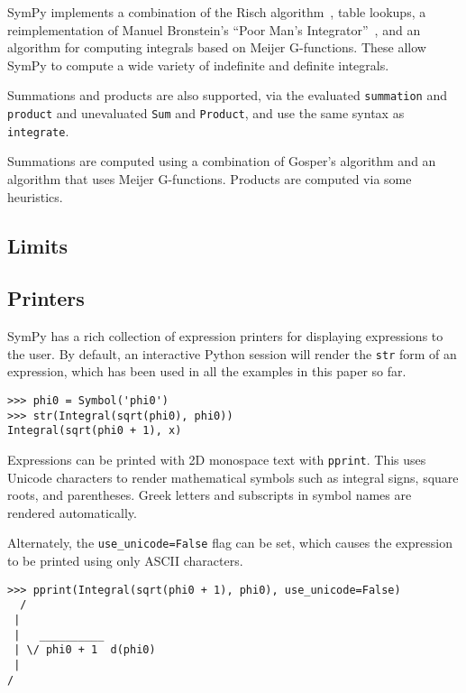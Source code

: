 SymPy implements a combination of the Risch
algorithm~\cite{bronstein2005integration}, table lookups, a reimplementation
of Manuel Bronstein's ``Poor Man's Integrator''~\cite{Bronstein2005pmint}, and
an algorithm for computing integrals based on Meijer G-functions. These allow
SymPy to compute a wide variety of indefinite and definite integrals.

Summations and products are also supported, via the evaluated \verb|summation|
and \verb|product| and unevaluated \verb|Sum| and \verb|Product|, and use the
same syntax as \verb|integrate|.

Summations are computed using a combination of Gosper's algorithm and an
algorithm that uses Meijer G-functions. Products are computed via some
heuristics.

\subsection{Limits}



\subsection{Printers}

SymPy has a rich collection of expression printers for displaying expressions
to the user. By default, an interactive Python session will render the
\verb|str| form of an expression, which has been used in all the examples in
this paper so far.

\begin{verbatim}
>>> phi0 = Symbol('phi0')
>>> str(Integral(sqrt(phi0), phi0))
Integral(sqrt(phi0 + 1), x)
\end{verbatim}

Expressions can be printed with 2D monospace text with \verb|pprint|. This
uses Unicode characters to render mathematical symbols such as integral signs,
square roots, and parentheses. Greek letters and subscripts in symbol names
are rendered automatically.

Alternately, the \verb|use_unicode=False| flag can be set, which causes the
expression to be printed using only ASCII characters.

\begin{verbatim}
>>> pprint(Integral(sqrt(phi0 + 1), phi0), use_unicode=False)
  /
 |
 |   __________
 | \/ phi0 + 1  d(phi0)
 |
/
\end{verbatim}

